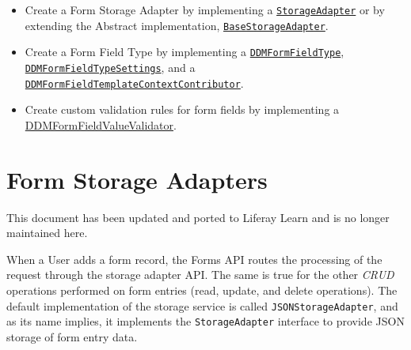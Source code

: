 \begin{itemize}
\tightlist
\item
  Create a Form Storage Adapter by implementing a
  \href{https://github.com/liferay/liferay-portal/blob/7.2.0-ga1/modules/apps/dynamic-data-mapping/dynamic-data-mapping-api/src/main/java/com/liferay/dynamic/data/mapping/storage/StorageAdapter.java}{\texttt{StorageAdapter}}
  or by extending the Abstract implementation,
  \href{https://github.com/liferay/liferay-portal/blob/7.2.0-ga1/modules/apps/dynamic-data-mapping/dynamic-data-mapping-api/src/main/java/com/liferay/dynamic/data/mapping/storage/BaseStorageAdapter.java}{\texttt{BaseStorageAdapter}}.
\item
  Create a Form Field Type by implementing a
  \href{https://github.com/liferay/liferay-portal/blob/7.2.0-ga1/modules/apps/dynamic-data-mapping/dynamic-data-mapping-api/src/main/java/com/liferay/dynamic/data/mapping/form/field/type/DDMFormFieldType.java}{\texttt{DDMFormFieldType}},
  \href{https://github.com/liferay/liferay-portal/blob/7.2.0-ga1/modules/apps/dynamic-data-mapping/dynamic-data-mapping-api/src/main/java/com/liferay/dynamic/data/mapping/form/field/type/DDMFormFieldTypeSettings.java}{\texttt{DDMFormFieldTypeSettings}},
  and a
  \href{https://github.com/liferay/liferay-portal/blob/7.2.0-ga1/modules/apps/dynamic-data-mapping/dynamic-data-mapping-api/src/main/java/com/liferay/dynamic/data/mapping/form/field/type/DDMFormFieldTemplateContextContributor.java}{\texttt{DDMFormFieldTemplateContextContributor}}.
\item
  Create custom validation rules for form fields by implementing a
  \href{https://github.com/liferay/liferay-portal/blob/7.2.0-ga1/modules/apps/dynamic-data-mapping/dynamic-data-mapping-api/src/main/java/com/liferay/dynamic/data/mapping/form/field/type/DDMFormFieldValueValidator.java}{DDMFormFieldValueValidator}.
\end{itemize}

\chapter{Form Storage Adapters}\label{form-storage-adapters}

{This document has been updated and ported to Liferay Learn and is no
longer maintained here.}

When a User adds a form record, the Forms API routes the processing of
the request through the storage adapter API. The same is true for the
other \emph{CRUD} operations performed on form entries (read, update,
and delete operations). The default implementation of the storage
service is called \texttt{JSONStorageAdapter}, and as its name implies,
it implements the \texttt{StorageAdapter} interface to provide JSON
storage of form entry data.

